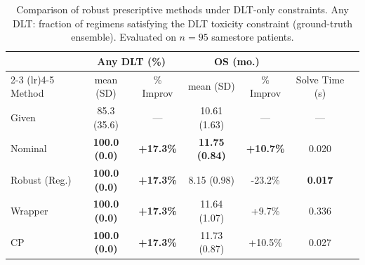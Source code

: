 \begin{table}[ht]
\centering
\caption{Comparison of robust prescriptive methods under DLT-only constraints. Any DLT: fraction of regimens satisfying the DLT toxicity constraint (ground-truth ensemble). Evaluated on $n=95$ samestore patients.}
\label{tab:chemo_dlt_only}
\begin{tabular}{lcccccc}
\toprule
& \multicolumn{2}{c}{Any DLT (\%)} & \multicolumn{2}{c}{OS (mo.)} & \\
\cmidrule(lr){2-3} \cmidrule(lr){4-5}
Method & mean (SD) & \% Improv & mean (SD) & \% Improv & Solve Time (s) \\
\midrule
Given & 85.3 (35.6) & --- & 10.61 (1.63) & --- & --- \\
\midrule
Nominal & \textbf{100.0 (0.0)} & \textbf{+17.3\%} & \textbf{11.75 (0.84)} & \textbf{+10.7\%} & 0.020 \\
Robust (Reg.) & \textbf{100.0 (0.0)} & \textbf{+17.3\%} & 8.15 (0.98) & -23.2\% & \textbf{0.017} \\
Wrapper & \textbf{100.0 (0.0)} & \textbf{+17.3\%} & 11.64 (1.07) & +9.7\% & 0.336 \\
CP & \textbf{100.0 (0.0)} & \textbf{+17.3\%} & 11.73 (0.87) & +10.5\% & 0.027 \\
\bottomrule
\end{tabular}
\end{table}
